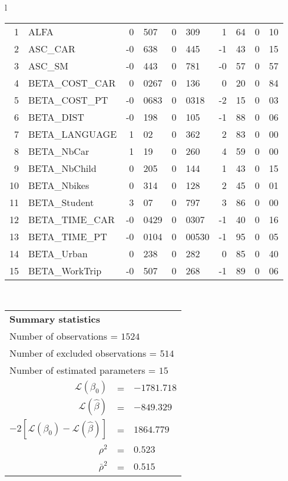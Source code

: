 \begin{tabular}{l}
\begin{tabular}{rlr@{.}lr@{.}lr@{.}lr@{.}l}
1 & ALFA & 0&507 & 0&309 & 1&64 & 0&10\\
2 & ASC_CAR & -0&638 & 0&445 & -1&43 & 0&15\\
3 & ASC_SM & -0&443 & 0&781 & -0&57 & 0&57\\
4 & BETA_COST_CAR & 0&0267 & 0&136 & 0&20 & 0&84\\
5 & BETA_COST_PT & -0&0683 & 0&0318 & -2&15 & 0&03\\
6 & BETA_DIST & -0&198 & 0&105 & -1&88 & 0&06\\
7 & BETA_LANGUAGE & 1&02 & 0&362 & 2&83 & 0&00\\
8 & BETA_NbCar & 1&19 & 0&260 & 4&59 & 0&00\\
9 & BETA_NbChild & 0&205 & 0&144 & 1&43 & 0&15\\
10 & BETA_Nbikes & 0&314 & 0&128 & 2&45 & 0&01\\
11 & BETA_Student & 3&07 & 0&797 & 3&86 & 0&00\\
12 & BETA_TIME_CAR & -0&0429 & 0&0307 & -1&40 & 0&16\\
13 & BETA_TIME_PT & -0&0104 & 0&00530 & -1&95 & 0&05\\
14 & BETA_Urban & 0&238 & 0&282 & 0&85 & 0&40\\
15 & BETA_WorkTrip & -0&507 & 0&268 & -1&89 & 0&06\\
\hline
\end{tabular}
\\
\begin{tabular}{rcl}
\multicolumn{3}{l}{\bf Summary statistics}\\
\multicolumn{3}{l}{ Number of observations = $1524$} \\
\multicolumn{3}{l}{ Number of excluded observations = $514$} \\
\multicolumn{3}{l}{ Number of estimated  parameters = $15$} \\
 $\mathcal{L}(\beta_0)$ &=&  $-1781.718$ \\
 $\mathcal{L}(\hat{\beta})$ &=& $-849.329 $  \\
 $-2[\mathcal{L}(\beta_0) -\mathcal{L}(\hat{\beta})]$ &=& $1864.779$ \\
    $\rho^2$ &=&   $0.523$ \\
    $\bar{\rho}^2$ &=&    $0.515$ \\
\end{tabular}
  \end{tabular}
